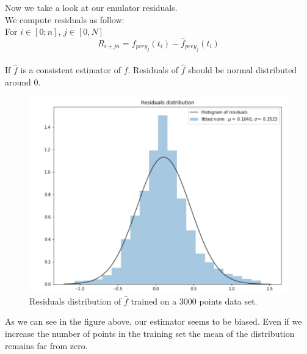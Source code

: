 \documentclass{article}
\begin{document}
Now we take a look at our emulator residuals.  \\

We compute residuals as follow: \\
For $i \in [0; n]$, $j \in [0, N]$ 
\begin{equation}
    R_{i+jn} = f_{prey_j}(t_i)- \hat{f}_{prey_j}(t_i)
\end{equation}
  \\  
If $\hat{f}$ is a consistent estimator of $f$. Residuals of $\hat{f}$ should be normal distributed around 0. 





\begin{figure}[H]
\centering
\includegraphics[scale=0.5]{image/distrib_residuals_NN.png}
\caption{Residuals distribution of $\hat{f}$ trained on a 3000 points data set. }
\label{fig: Signal model}
\end{figure}

As we can see in the figure above, our estimator seems to be biased. Even if we increase the number of points in the training set the mean of the distribution remains far from zero.
\end{document}
